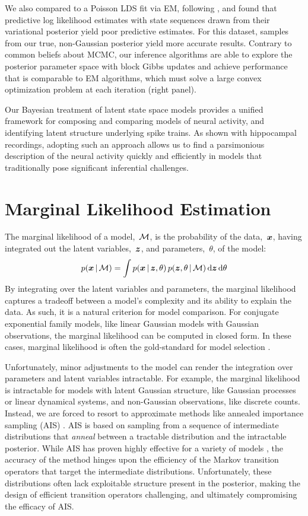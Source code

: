 We also compared to a Poisson LDS fit via EM, following \citep{macke2011empirical},
and found that predictive log likelihood estimates with state sequences drawn from 
their variational posterior yield poor predictive estimates. For this dataset, samples 
from our true, non-Gaussian posterior yield more accurate results. Contrary 
to common beliefs about MCMC, our inference algorithms are able to 
explore the posterior parameter space with block Gibbs updates and achieve performance 
that is comparable to EM algorithms, which must solve a large convex optimization problem 
at each iteration (right panel).

Our Bayesian treatment of latent state space models provides a unified 
framework for composing and comparing models of neural activity, and 
identifying latent structure underlying spike trains. As shown with
hippocampal recordings, adopting such an approach allows us to find
a parsimonious description of the neural activity quickly and efficiently
in models that traditionally pose significant inferential challenges.



\section{Marginal Likelihood Estimation}
The marginal likelihood of a model,~$\mathcal{M}$, is the probability of the
data,~$\boldsymbol{x}$, having integrated out the latent
variables,~$\boldsymbol{z}$, and parameters,~$\theta$, of the model:
\begin{align*}
  {p(\boldsymbol{x}\,|\,\mathcal{M}) = \int p(\boldsymbol{x}\,|\,\boldsymbol{z}, \theta) \, p(\boldsymbol{z}, \theta
  \,|\,\mathcal{M}) \, \mathrm{d} \boldsymbol{z}\, \mathrm{d}\theta}
\end{align*}
By integrating over the latent variables and parameters, the marginal
likelihood captures a tradeoff between a model's complexity and its
ability to explain the data.  As such, it is a natural criterion for
model comparison. For conjugate exponential family 
models, like linear Gaussian models with Gaussian observations,
 the marginal likelihood can be computed in closed form. 
In these cases, marginal likelihood is often the gold-standard 
for model selection \cite{kass1995bayes}.

Unfortunately, minor adjustments to the model can render the
integration over parameters and latent variables intractable.  For
example, the marginal likelihood is intractable for models with latent
Gaussian structure, like Gaussian processes or linear dynamical
systems, and non-Gaussian observations, like discrete counts.
Instead, we are forced to resort to approximate methods like annealed
importance sampling (AIS) \cite{neal2001annealed}.  AIS is based on
sampling from a sequence of intermediate distributions that
\emph{anneal} between a tractable distribution and the intractable
posterior. While AIS has proven highly effective for a variety of
models \cite{grosse2015sandwiching}, the accuracy of the method hinges
upon the efficiency of the Markov transition operators that target
the intermediate distributions.  Unfortunately, these distributions
often lack exploitable structure present in the posterior, making the
design of efficient transition operators challenging, and ultimately
compromising the efficacy of AIS.

